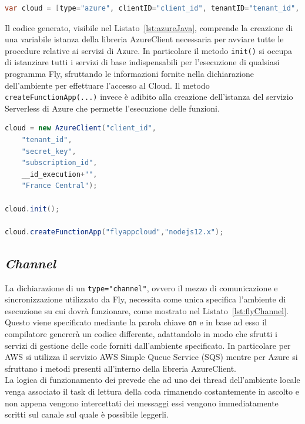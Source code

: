 \begin{lstlisting}[language=Java,caption={Dichiarazione di un ambiente Cloud su Azure.}, label={lst:azure}]
var cloud = [type="azure", clientID="client_id", tenantID="tenant_id", secret_key="secret_key", subscriptionID="subscription_id", region="France Central", language="nodejs12.x", threads="2", seconds="300"]
\end{lstlisting}

Il codice generato, visibile nel Listato~\ref{lst:azureJava}, comprende la creazione di una variabile istanza della libreria AzureClient necessaria per avviare tutte le procedure relative ai servizi di Azure. In particolare il metodo \verb|init()| si occupa di istanziare tutti i servizi di base indispensabili per l'esecuzione di qualsiasi programma Fly, sfruttando le informazioni fornite nella dichiarazione dell'ambiente per effettuare l'accesso al Cloud. Il metodo \verb|createFunctionApp(...)| invece è adibito alla creazione dell'istanza del servizio Serverless di Azure che permette l'esecuzione delle funzioni.\\

\begin{lstlisting}[language=Java,caption={Codice generato per l'ambiente Cloud su Azure.}, label={lst:azureJava}]
cloud = new AzureClient("client_id",
    "tenant_id",
    "secret_key",
    "subscription_id",
    __id_execution+"",
    "France Central");
    
cloud.init();

cloud.createFunctionApp("flyappcloud","nodejs12.x");
\end{lstlisting}

\subsection{\textit{Channel}}
La dichiarazione di un \verb|type|\verb|=|\verb|"channel"|, ovvero il mezzo di comunicazione e sincronizzazione utilizzato da Fly, necessita come unica specifica l'ambiente di esecuzione su cui dovrà funzionare, come mostrato nel Listato~\ref{lst:flyChannel}. Questo viene specificato mediante la parola chiave \verb|on| e in base ad esso il compilatore genererà un codice differente, adattandolo in modo che sfrutti i servizi di gestione delle code forniti dall'ambiente specificato. In particolare per AWS si utilizza il servizio AWS Simple Queue Service (SQS) \cite{SQS} mentre per Azure si sfruttano i metodi presenti all'interno della libreria AzureClient.\\
La logica di funzionamento dei prevede che ad uno dei thread dell'ambiente locale venga associato il task di lettura della coda rimanendo costantemente in ascolto e non appena vengono intercettati dei messaggi essi vengono immediatamente scritti sul canale sul quale è possibile leggerli.\\


